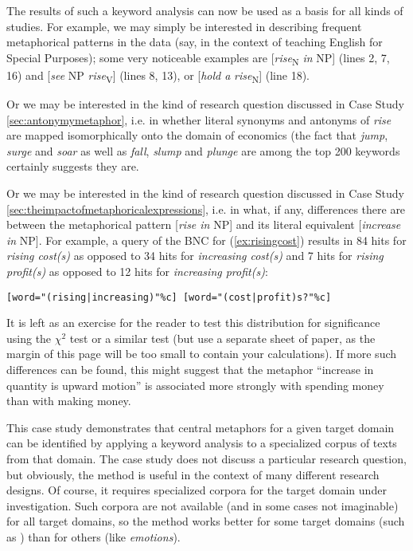 The results of such a keyword  analysis can now be used as a basis for all kinds of studies. For example, we may simply be interested in describing frequent metaphorical  patterns in the data (say, in the context of teaching English for Special Purposes); some very noticeable examples are [\textit{rise}\textsubscript{N} \textit{in} NP] (lines 2, 7, 16) and [\textit{see} NP \textit{rise}\textsubscript{V}] (lines 8, 13), or [\textit{hold a} \textit{rise}\textsubscript{N}] (line 18).

Or we may be interested in the kind of research question discussed in Case Study \ref{sec:antonymymetaphor}, i.e. in whether literal  synonyms  and antonyms  of \textit{rise} are mapped isomorphically onto the domain of economics (the fact that \textit{jump}, \textit{surge} and \textit{soar} as well as \textit{fall}, \textit{slump} and \textit{plunge} are among the top 200 keywords  certainly suggests they are.

Or we may be interested in the kind of research question discussed in Case Study \ref{sec:theimpactofmetaphoricalexpressions}, i.e. in what, if any, differences there are between the metaphorical pattern [\textit{rise in} NP] and its literal  equivalent [\textit{increase in} NP]. For example, a query of the BNC  for (\ref{ex:risingcost}) results in 84 hits for \textit{rising cost(s)} as opposed to 34 hits for \textit{increasing cost(s)} and 7 hits for \textit{rising profit(s)} as opposed to 12 hits for \textit{increasing profit(s)}:

\begin{exe}
\ex \texttt{[word="(rising|increasing)"\%c] [word="(cost|profit)s?"\%c]}
\label{ex:risingcost}
\end{exe}


It is left as an exercise for the reader to test this distribution  for significance using the $\chi^2$  test or a similar test (but use a separate sheet of paper, as the margin of this page will be too small to contain your calculations). If more such differences can be found, this might suggest that the metaphor  ``increase in quantity is upward motion'' is associated  more strongly with spending money than with making money.

This case study demonstrates that central metaphors  for a given target domain can be identified by applying a keyword  analysis to a specialized corpus of texts from that domain. The case study does not discuss a particular research question, but obviously, the method is useful in the context of many different research designs.  Of course, it requires specialized corpora for the target domain under investigation. Such corpora are not available (and in some cases not imaginable) for all target domains, so the method works better for some target domains (such as ) than for others (like  \textit{emotions}).

